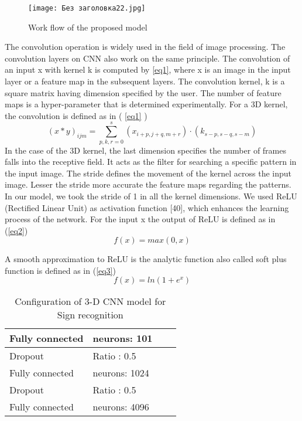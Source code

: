 \documentclass[
  manuscript=article,  %
  layout=preprint,  %
  year=20xx,
  volume=x,
]{extra/ledger}
\begin{document}
\begin{figure}[h!]
    \centering
    \texttt{[image: Без заголовка22.jpg]}
    \caption{Work flow of the proposed model}
    \label{f2}
\end{figure}



The convolution operation is widely used in the field of image processing. The convolution layers on CNN also work on the same principle. The convolution of an input x with kernel k is computed by \ref{eq1}, where x is an image in the input layer or a feature map in the subsequent layers. The convolution kernel, k is a square matrix having dimension specified by the user. The number of feature maps is a hyper-parameter that is determined experimentally. For a 3D kernel, the convolution is defined as in ( \ref{eq1} )
\begin{equation}
(x*y)_{ijm}=\sum^s_{p,k,r=0} (x_{i+p,j+q,m+r})\cdot (k_{s-p, s-q, s-m}) \label{eq1}
\end{equation}
In the case of the 3D kernel, the last dimension specifies the number of frames falls into the receptive field. It acts as the filter for searching a specific pattern in the input image. The stride defines the movement of the kernel across the input image. Lesser the stride more accurate the feature maps regarding the patterns. In our model, we took the stride of 1 in all the kernel dimensions. We used ReLU (Rectified Linear Unit) as activation function [40], which enhances the learning process of the network. For the input x the output of ReLU is defined as in (\ref{eq2})
\begin{equation}
f(x)=max(0,x) \label{eq2}
\end{equation}

A smooth approximation to ReLU is the analytic function also called soft plus function is defined as in (\ref{eq3})
\begin{equation}
f (x) = ln(1 + e^x) \label{eq3}
\end{equation}






 

\begin{table}[!ht]
\caption{ Configuration of 3-D CNN model for Sign recognition\label{tab1}}
\begin{tabular*}{\columnwidth}{@{\extracolsep\fill}llll@{\extracolsep\fill}}
\toprule
Fully connected & neurons: 101\\
\midrule
Dropout & Ratio : 0.5 \\
Fully connected & neurons: 1024 \\
Dropout & Ratio : 0.5 \\
Fully connected & neurons: 4096\\
\bottomrule
\end{tabular*}
\end{table}
\end{document}
